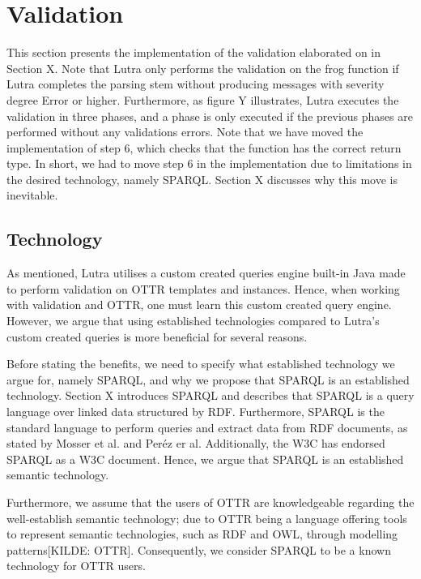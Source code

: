 \section{Validation}
\label{implValidation}
This section presents the implementation of the validation elaborated on in Section X. Note that Lutra only performs the validation on the frog function if Lutra completes the parsing stem without producing messages with severity degree Error or higher. Furthermore, as figure Y illustrates, Lutra executes the validation in three phases, and a phase is only executed if the previous phases are performed without any validations errors. Note that we have moved the implementation of step 6, which checks that the function has the correct return type. In short, we had to move step 6 in the implementation due to limitations in the desired technology, namely SPARQL. Section X discusses why this move is inevitable.

\subsection{Technology}
As mentioned, Lutra utilises a custom created queries engine built-in Java made to perform validation on OTTR templates and instances. Hence, when working with validation and OTTR, one must learn this custom created query engine. However, we argue that using established technologies compared to Lutra's custom created queries is more beneficial for several reasons. 

\para
Before stating the benefits, we need to specify what established technology we argue for, namely SPARQL, and why we propose that SPARQL is an established technology. Section X introduces SPARQL and describes that SPARQL is a query language over linked data structured by RDF. Furthermore, SPARQL is the standard language to perform queries and extract data from RDF documents, as stated by Mosser et al.\cite[1]{MosserSPARQL} and Peréz er al\cite[1]{PerezSPARQL}. Additionally, the W3C has endorsed SPARQL as a W3C document. Hence, we argue that SPARQL is an established semantic technology. 

\para
Furthermore, we assume that the users of OTTR are knowledgeable regarding the well-establish semantic technology; due to OTTR being a language offering tools to represent semantic technologies, such as RDF and OWL, through modelling patterns[KILDE: OTTR]. Consequently, we consider SPARQL to be a known technology for OTTR users. 

